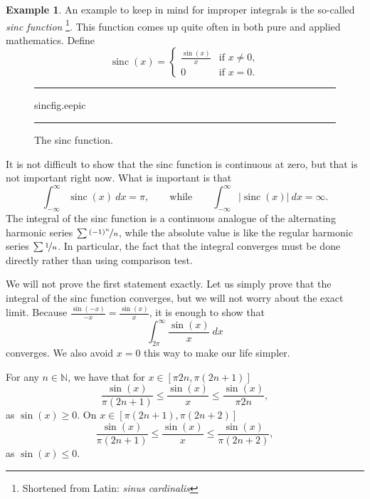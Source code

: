\documentclass[12pt]{book}
\newenvironment{myfigureht}{%
\begin{figure}[h!t]
\noindent\rule{\textwidth}{0.4pt}\vspace{12pt}\par\centering}%
{\par\noindent\rule{\textwidth}{0.4pt}
\end{figure}}
\newcommand{\abs}[1]{\left\lvert {#1} \right\rvert}
\newcommand{\N}{{\mathbb{N}}}
\newcommand{\myindex}[1]{#1\index{#1}}
\theoremstyle{plain}
\theoremstyle{remark}
\theoremstyle{definition}
\theoremstyle{exercise}
\theoremstyle{example}
\newtheorem{example}[thm]{Example}
\begin{document}
\begin{example}
An example to keep in mind for improper integrals
is the so-called \emph{\myindex{sinc function}}%
\footnote{Shortened from Latin: \emph{sinus cardinalis}}.
This function comes up quite often
in both pure and applied mathematics.  Define
\begin{equation*}
\operatorname{sinc}(x) =
\begin{cases}
\frac{\sin(x)}{x} & \text{if $x \not= 0$} , \\
0 & \text{if $x = 0$} .
\end{cases}
\end{equation*}
\begin{myfigureht}
{sincfig.eepic}
\caption{The sinc function.
\label{figsinc}}
\end{myfigureht}

It is not difficult to show that
the sinc function is continuous at zero, but that is
not important right now.  What is important is that
\begin{equation*}
\int_{-\infty}^\infty \operatorname{sinc}(x) ~dx = \pi ,
\qquad \text{while} \qquad
\int_{-\infty}^\infty \abs{\operatorname{sinc}(x)} ~dx = \infty .
\end{equation*}
The integral of the sinc function is a continuous analogue of the
alternating harmonic series $\sum \nicefrac{{(-1)}^n}{n}$, while the
absolute value is like the regular harmonic series $\sum \nicefrac{1}{n}$.
In particular, the fact that the integral converges must be done directly
rather than using comparison test.

We will not prove the first statement exactly.  Let us simply prove
that the integral of the sinc function converges, but we will not worry
about the exact limit.  Because $\frac{\sin(-x)}{-x} = \frac{\sin(x)}{x}$, it is
enough to show that
\begin{equation*}
\int_{2\pi}^\infty \frac{\sin(x)}{x}~dx
\end{equation*}
converges.  We
also avoid $x=0$ this way to make our life simpler.

For any $n \in \N$, we have that for $x \in [\pi 2n, \pi (2n+1)]$
\begin{equation*}
\frac{\sin(x)}{\pi (2n+1)}
\leq
\frac{\sin(x)}{x}
\leq
\frac{\sin(x)}{\pi 2n} ,
\end{equation*}
as $\sin(x) \geq 0$.  On $x \in [\pi (2n+1), \pi (2n+2)]$
\begin{equation*}
\frac{\sin(x)}{\pi (2n+1)}
\leq
\frac{\sin(x)}{x}
\leq
\frac{\sin(x)}{\pi (2n+2)} ,
\end{equation*}
as $\sin(x) \leq 0$.


\end{example}
\end{document}
